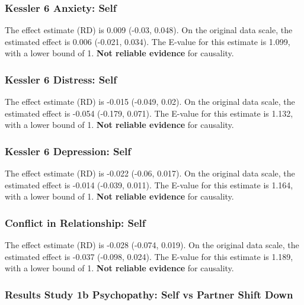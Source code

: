 \documentclass[
  singlecolumn]{article}
\begin{document}
\subsubsection{Kessler 6 Anxiety: Self}\label{kessler-6-anxiety-self-8}

The effect estimate (RD) is 0.009 (-0.03, 0.048). On the original data
scale, the estimated effect is 0.006 (-0.021, 0.034). The E-value for
this estimate is 1.099, with a lower bound of 1. \textbf{Not reliable
evidence} for causality.

\subsubsection{Kessler 6 Distress:
Self}\label{kessler-6-distress-self-8}

The effect estimate (RD) is -0.015 (-0.049, 0.02). On the original data
scale, the estimated effect is -0.054 (-0.179, 0.071). The E-value for
this estimate is 1.132, with a lower bound of 1. \textbf{Not reliable
evidence} for causality.

\subsubsection{Kessler 6 Depression:
Self}\label{kessler-6-depression-self-8}

The effect estimate (RD) is -0.022 (-0.06, 0.017). On the original data
scale, the estimated effect is -0.014 (-0.039, 0.011). The E-value for
this estimate is 1.164, with a lower bound of 1. \textbf{Not reliable
evidence} for causality.

\subsubsection{Conflict in Relationship:
Self}\label{conflict-in-relationship-self-8}

The effect estimate (RD) is -0.028 (-0.074, 0.019). On the original data
scale, the estimated effect is -0.037 (-0.098, 0.024). The E-value for
this estimate is 1.189, with a lower bound of 1. \textbf{Not reliable
evidence} for causality.

\subsubsection{Results Study 1b Psychopathy: Self vs Partner Shift
Down}\label{results-study-1b-psychopathy-self-vs-partner-shift-down}
\end{document}
